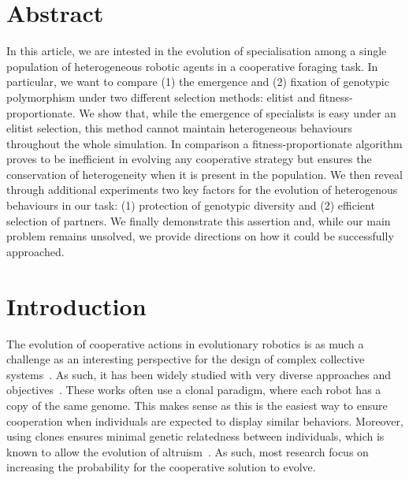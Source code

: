 \clearpage




\section{Abstract}
  In this article, we are intested in the evolution of specialisation among a single population of heterogeneous robotic agents in a cooperative foraging task. In particular, we want to compare (1) the emergence and (2) fixation of genotypic polymorphism under two different selection methods: elitist and fitness-proportionate. We show that, while the emergence of specialists is easy under an elitist selection, this method cannot maintain heterogeneous behaviours throughout the whole simulation. In comparison a fitness-proportionate algorithm proves to be inefficient in evolving any cooperative strategy but ensures the conservation of heterogeneity when it is present in the population. We then reveal through additional experiments two key factors for the evolution of heterogenous behaviours in our task: (1) protection of genotypic diversity and (2) efficient selection of partners. We finally demonstrate this assertion and, while our main problem remains unsolved, we provide directions on how it could be successfully approached.


\section{Introduction}

  The evolution of cooperative actions in evolutionary robotics is as much a challenge as an interesting perspective for the design of complex collective systems~\parencite{Doncieux2015}. As such, it has been widely studied with very diverse approaches and objectives~\parencite{Waibel2009, Hauert2014, Trianni2007, Lichocki2012}. These works often use a clonal paradigm, where each robot has a copy of the same genome. This makes sense as this is the easiest way to ensure cooperation when individuals are expected to display similar behaviors. Moreover, using clones ensures minimal genetic relatedness between individuals, which is known to allow the evolution of altruism~\parencite{Waibel2011, Montanier2011}. As such, most research focus on increasing the probability for the cooperative solution to evolve.

